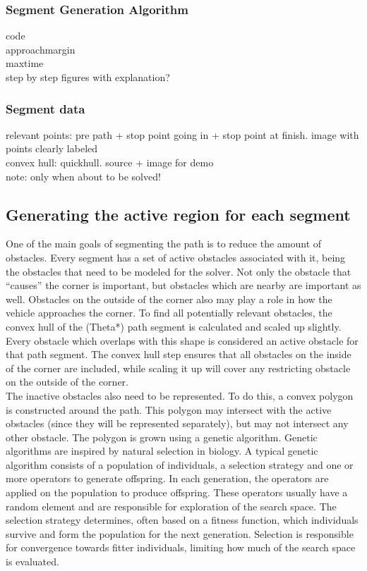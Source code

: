 \subsubsection{Segment Generation Algorithm}
code \\
approachmargin \\
maxtime \\
step by step figures with explanation? 
\subsubsection{Segment data}
relevant points: pre path + stop point going in + stop point at finish. image with points clearly labeled \\
convex hull: quickhull. source + image for demo \\
note: only when about to be solved!
\subsection{Generating the active region for each segment}
One of the main goals of segmenting the path is to reduce the amount of obstacles. Every segment has a set of active obstacles associated with it, being the obstacles that need to be modeled for the solver. Not only the obstacle that ``causes'' the corner is important, but obstacles which are nearby are important as well. Obstacles on the outside of the corner also may play a role in how the vehicle approaches the corner. To find all potentially relevant obstacles, the convex hull of the (Theta*) path segment is calculated and scaled up slightly. Every obstacle which overlaps with this shape is considered an active obstacle for that path segment. The convex hull step ensures that all obstacles on the inside of the corner are included, while scaling it up will cover any restricting obstacle on the outside of the corner.\\
The inactive obstacles also need to be represented. To do this, a convex polygon is constructed around the path. This polygon may intersect with the active obstacles (since they will be represented separately), but may not intersect any other obstacle. The polygon is grown using a genetic algorithm. Genetic algorithms are inspired by natural selection in biology. A typical genetic algorithm consists of a population of individuals, a selection strategy and one or more operators to generate offspring. In each generation, the operators are applied on the population to produce offspring. These operators usually have a random element and are responsible for exploration of the search space. The selection strategy determines, often based on a fitness function, which individuals survive and form the population for the next generation. Selection is responsible for convergence towards fitter individuals, limiting how much of the search space is evaluated. \\

